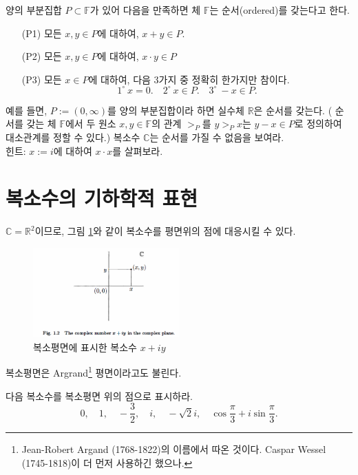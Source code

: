 \begin{salt_exercise} \label{ex-1-3}
양의 부분집합 $P\subset \mathbb F$가 있어 다음을 만족하면
체 $\mathbb F$는 순서(ordered)를 갖는다고 한다.
\begin{itemize}
\item[(P1)] 모든 $x,y\in P$에 대하여, $x+y\in P$.
\item[(P2)] 모든 $x,y\in P$에 대하여, $x\cdot y \in P$
\item[(P3)] 모든 $x\in P$에 대하여, 다음 3가지 중  정확히 한가지만 참이다.
$$
1^{\circ} \ x=0. \quad 2^{\circ} \ x\in P. \quad 3^{\circ} \ -x\in P.
$$
\end{itemize}
예를 들면, $P:=(0,\infty)$를 양의 부분집합이라 하면
실수체 $\mathbb R$은 순서를 갖는다.
( 순서를 갖는 체 $\mathbb F$에서 두 원소 $x,y\in \mathbb F$의 관계 $>_P$를
$y>_P x$는 $y-x \in P$로 정의하여 대소관계를 정할 수 있다.)
복소수 $\mathbb C$는 순서를 가질 수 없음을 보여라. \\[1ex]
힌트: $x:=i$에 대하여 $x\cdot x$를 살펴보라.
\end{salt_exercise}

\section{복소수의 기하학적 표현}

$\mathbb C = \mathbb R^2$이므로, 
그림 \ref{fig-1-2}와 같이 복소수를 평면위의 점에 대응시킬 수 있다.

\begin{figure}[!h]
\begin{center}
\includegraphics[width=0.5\textwidth]{./SaltChapter/fig-1-2}
\end{center}
\caption{복소평면에 표시한 복소수 $x+iy$}
\label{fig-1-2}
\end{figure}

복소평면은 Argrand\footnote{ 
Jean-Robert Argand (1768-1822)의 이름에서 따온 것이다.
Caspar Wessel (1745-1818)이 더 먼저 사용하긴 했으나.}
평면이라고도 불린다.

\begin{salt_exercise} \label{ex-1-4}
다음 복소수를 복소평면 위의 점으로 표시하라.
$$
0, \quad 1 , \quad -\frac32, \quad i, \quad -\sqrt{2}i,
\quad \cos \frac\pi3 + i\sin\frac\pi3.
$$
\end{salt_exercise}

